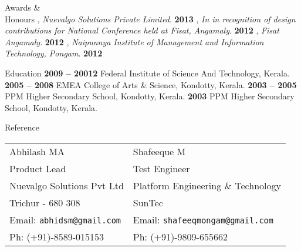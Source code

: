 \documentclass{resume}
\begin{document}

\begin{category}{Awards \&\\ Honours}
  , {\em Nuevalgo Solutions Private Limited}. \hfill \textbf{2013}
  , {\em  In in recognition of design contributions for National Conference held at Fisat, Angamaly}. \hfill \textbf{2012}
  , {\em Fisat Angamaly}. \hfill \textbf{2012}
  , {\em  Naipunnya  Institute  of  Management  and  Information  Technology, Pongam}. \hfill \textbf{2012}
\end{category}


\begin{category}{Education}
   \hfill \textbf{2009 -- 20012}
  \citemnobullet Federal Institute of Science And Technology, Kerala.
   \hfill \textbf{2005 -- 2008}
  \citemnobullet  EMEA College of Arts \& Science, Kondotty, Kerala.
   \hfill \textbf{2003 -- 2005}
  \citemnobullet PPM Higher Secondary School, Kondotty, Kerala.
   \hfill \textbf{2003}
  \citemnobullet PPM Higher Secondary School, Kondotty, Kerala.\end{category}
  



\begin{category}{Reference}
  \citemnobullet \\
  \begin{tabular}{ll}Abhilash MA&Shafeeque M\\
    Product Lead&Test Engineer\\
    Nuevalgo Solutions Pvt Ltd&Platform Engineering \& Technology\\
    Trichur -  680 308&SunTec\\
    Email: \mbox{\small\tt abhidsm@gmail.com}&Email: \mbox{\small\tt shafeeqmongam@gmail.com}\\
    Ph: (+91)-8589-015153&Ph: (+91)-9809-655662
  \end{tabular}
\end{category}
\end{document}

